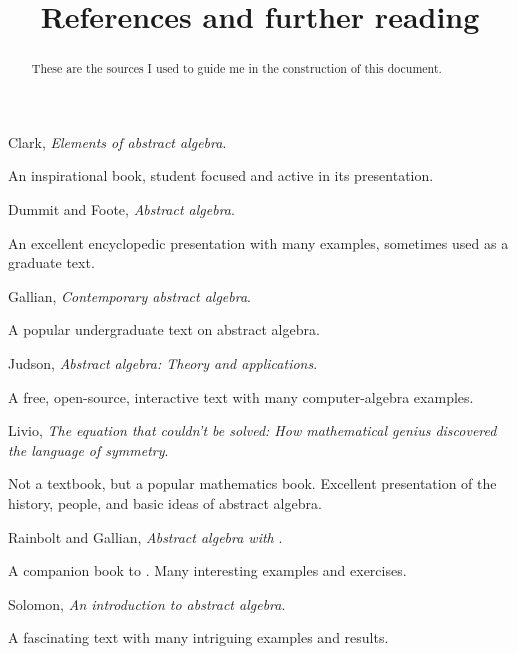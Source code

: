 \documentclass{ximera}
\title{References and further reading}
\begin{document}
\begin{abstract}
  These are the sources I used to guide me in the construction of this
  document.
\end{abstract}
\maketitle

\begin{thebibliography}{MMMM2002}
 Clark, \textit{Elements of abstract algebra}.
  
  \begin{annotate}
    An inspirational book, student focused and active in its
    presentation.
  \end{annotate}
   
  
 Dummit and Foote, \textit{Abstract algebra}.

  \begin{annotate}
    An excellent encyclopedic presentation with many examples,
    sometimes used as a graduate text.
  \end{annotate}

 Gallian, \textit{Contemporary abstract algebra}.

  \begin{annotate}
    A popular undergraduate text on abstract algebra.
  \end{annotate}
   
 Judson, \textit{Abstract algebra: Theory and applications}.

  \begin{annotate}
    A free, open-source, interactive text with many computer-algebra
    examples.
  \end{annotate}


 Livio, \textit{The equation that couldn't be solved:
  How mathematical genius discovered the language of symmetry}.

  \begin{annotate}
    Not a textbook, but a popular mathematics book. Excellent
    presentation of the history, people, and basic ideas of abstract
    algebra.
  \end{annotate}


 Rainbolt and Gallian, \textit{Abstract algebra with \GAP}.
  
  \begin{annotate}
    A companion book to \cite{jG2017}. Many interesting examples and
    exercises.
  \end{annotate}

   
 Solomon, \textit{An introduction to abstract algebra}.

  \begin{annotate}
    A fascinating text with many intriguing examples and results.
  \end{annotate}
  
\end{thebibliography}
\end{document}
